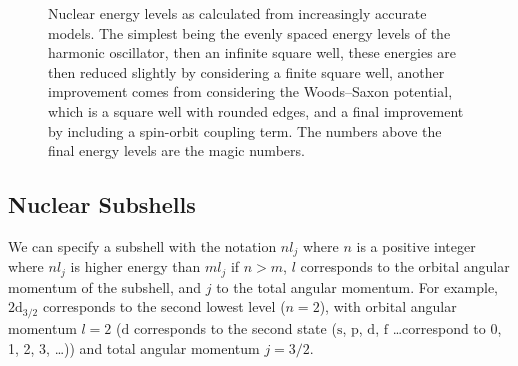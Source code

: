 \documentclass[fleqn]{NotesClass}
\begin{document}
\begin{figure}
        \caption[Energy levels in various models.]{Nuclear energy levels as calculated from increasingly accurate models. The simplest being the evenly spaced energy levels of the harmonic oscillator, then an infinite square well, these energies are then reduced slightly by considering a finite square well, another improvement comes from considering the Woods--Saxon potential, which is a square well with rounded edges, and a final improvement by including a spin-orbit coupling term. The numbers above the final energy levels are the magic numbers.}
        \label{fig:energy levels}
    \end{figure}
    
    \subsection{Nuclear Subshells}
    We can specify a subshell with the notation \(nl_j\) where \(n\) is a positive integer where \(nl_j\) is higher energy than \(ml_j\) if \(n > m\), \(l\) corresponds to the orbital angular momentum of the subshell, and \(j\) to the total angular momentum.
    For example, \(2\mathrm{d}_{3/2}\) corresponds to the second lowest level (\(n = 2\)), with orbital angular momentum \(l = 2\) (\(\mathrm{d}\) corresponds to the second state (\(\mathrm{s}\), \(\mathrm{p}\), \(\mathrm{d}\), \(\mathrm{f}\) \dots correspond to 0, 1, 2, 3, \dots)) and total angular momentum \(j = 3/2\).
    
\end{document}
